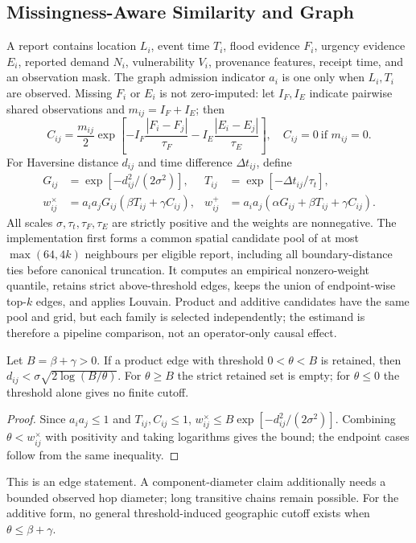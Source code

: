 \documentclass[runningheads]{llncs}
\begin{document}
\subsection{Missingness-Aware Similarity and Graph}

A report contains location $L_i$, event time $T_i$, flood evidence $F_i$,
urgency evidence $E_i$, reported demand $N_i$, vulnerability $V_i$, provenance
features, receipt time, and an observation mask. The graph admission indicator
$a_i$ is one only when $L_i,T_i$ are observed. Missing $F_i$ or $E_i$ is not
zero-imputed: let $I_F,I_E$ indicate pairwise shared observations and
$m_{ij}=I_F+I_E$; then
\[
C_{ij}=\frac{m_{ij}}{2}\exp\!\left[-I_F\frac{|F_i-F_j|}{\tau_F}
-I_E\frac{|E_i-E_j|}{\tau_E}\right],
\quad C_{ij}=0\ \text{if }m_{ij}=0.
\]
For Haversine distance $d_{ij}$ and time difference $\Delta t_{ij}$, define
\begin{align}
G_{ij}&=\exp[-d_{ij}^{2}/(2\sigma^2)],&
T_{ij}&=\exp[-\Delta t_{ij}/\tau_t],\nonumber\\
w^\times_{ij}&=a_i a_jG_{ij}(\beta T_{ij}+\gamma C_{ij}),&
w^+_{ij}&=a_i a_j(\alpha G_{ij}+\beta T_{ij}+\gamma C_{ij}).
\label{eq:similarities}
\end{align}
All scales $\sigma,\tau_t,\tau_F,\tau_E$ are strictly positive and the
weights are nonnegative. The implementation first forms a common spatial
candidate pool of at most $\max(64,4k)$ neighbours per eligible report,
including all boundary-distance ties before canonical truncation. It computes
an empirical nonzero-weight quantile, retains strict above-threshold edges,
keeps the union of endpoint-wise top-$k$ edges, and applies Louvain. Product
and additive candidates have the same pool and grid, but each family is
selected independently; the estimand is therefore a pipeline comparison, not
an operator-only causal effect.

\begin{theorem}
Let $B=\beta+\gamma>0$. If a product edge with threshold $0<\theta<B$ is
retained, then
$d_{ij}<\sigma\sqrt{2\log(B/\theta)}$. For $\theta\ge B$ the strict retained
set is empty; for $\theta\le0$ the threshold alone gives no finite cutoff.
\end{theorem}
\begin{proof}
Since $a_ia_j\le1$ and $T_{ij},C_{ij}\le1$,
$w^\times_{ij}\le B\exp[-d_{ij}^{2}/(2\sigma^2)]$. Combining
$\theta<w^\times_{ij}$ with positivity and taking logarithms gives the bound;
the endpoint cases follow from the same inequality.
\end{proof}
This is an edge statement. A component-diameter claim additionally needs a
bounded observed hop diameter; long transitive chains remain possible. For
the additive form, no general threshold-induced geographic cutoff exists when
$\theta\le\beta+\gamma$.
\end{document}
